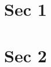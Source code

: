 \documentclass{beamer}
\begin{document}
\begin{frame}
     \tableofcontents
\end{frame}

\begin{frame}
    \tableofcontents
\end{frame}

\restoregeometry

\section{Sec 1}
\section{Sec 2}
\end{document}

